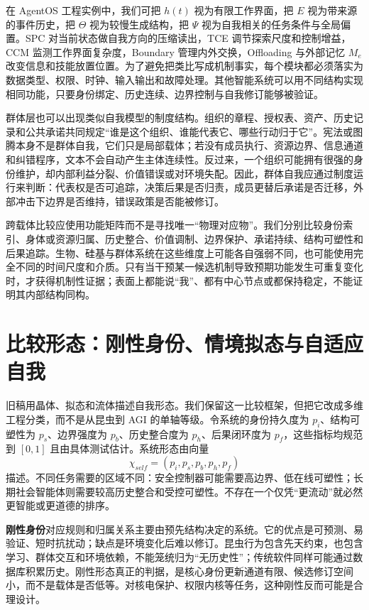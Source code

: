 在 AgentOS 工程实例中，我们可把 $h(t)$ 视为有限工作界面，把 $E$ 视为带来源的事件历史，把 $\Theta$ 视为较慢生成结构，把 $\Psi$ 视为自我相关的任务条件与全局偏置。SPC 对当前状态做自我方向的压缩读出，TCE 调节探索尺度和控制增益，CCM 监测工作界面复杂度，Boundary 管理内外交换，Offloading 与外部记忆 $M_e$ 改变信息和技能放置位置。为了避免把类比写成机制事实，每个模块都必须落实为数据类型、权限、时钟、输入输出和故障处理。其他智能系统可以用不同结构实现相同功能，只要身份绑定、历史连续、边界控制与自我修订能够被验证。

群体层也可以出现类似自我模型的制度结构。组织的章程、授权表、资产、历史记录和公共承诺共同规定“谁是这个组织、谁能代表它、哪些行动归于它”。宪法或图腾本身不是群体自我，它们只是局部载体；若没有成员执行、资源边界、信息通道和纠错程序，文本不会自动产生主体连续性。反过来，一个组织可能拥有很强的身份维护，却内部利益分裂、价值错误或对环境失配。因此，群体自我应通过制度运行来判断：代表权是否可追踪，决策后果是否归责，成员更替后承诺是否迁移，外部冲击下边界是否维持，错误政策是否能被修订。

跨载体比较应使用功能矩阵而不是寻找唯一“物理对应物”。我们分别比较身份索引、身体或资源归属、历史整合、价值调制、边界保护、承诺持续、结构可塑性和后果追踪。生物、硅基与群体系统在这些维度上可能各自强弱不同，也可能使用完全不同的时间尺度和介质。只有当干预某一候选机制导致预期功能发生可重复变化时，才获得机制性证据；表面上都能说“我”、都有中心节点或都保持稳定，不能证明其内部结构同构。

\section{比较形态：刚性身份、情境拟态与自适应自我}
\label{sec:section_7243}

旧稿用晶体、拟态和流体描述自我形态。我们保留这一比较框架，但把它改成多维工程分类，而不是从昆虫到 AGI 的单轴等级。令系统的身份持久度为 $p_i$、结构可塑性为 $p_s$、边界强度为 $p_b$、历史整合度为 $p_h$、后果闭环度为 $p_f$，这些指标均规范到 $[0,1]$ 且由具体测试估计。系统形态由向量
\[
\chi_{self}=(p_i,p_s,p_b,p_h,p_f)
\]
描述。不同任务需要的区域不同：安全控制器可能需要高边界、低在线可塑性；长期社会智能体则需要较高历史整合和受控可塑性。不存在一个仅凭“更流动”就必然更智能或更道德的排序。

\textbf{刚性身份}对应规则和归属关系主要由预先结构决定的系统。它的优点是可预测、易验证、短时抗扰动；缺点是环境变化后难以修订。昆虫行为包含先天约束，也包含学习、群体交互和环境依赖，不能笼统归为“无历史性”；传统软件同样可能通过数据库积累历史。刚性形态真正的判据，是核心身份更新通道有限、候选修订空间小，而不是载体是否低等。对核电保护、权限内核等任务，这种刚性反而可能是合理设计。

